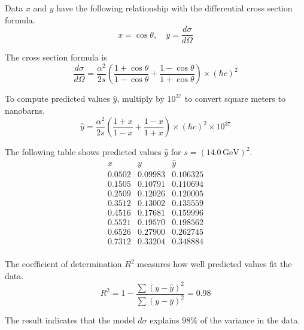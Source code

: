Data $x$ and $y$ have the following relationship
with the differential cross section formula.
\begin{equation*}
x=\cos\theta,
\quad
y=\frac{d\sigma}{d\Omega}
\end{equation*}

The cross section formula is
\begin{equation*}
\frac{d\sigma}{d\Omega}
=
\frac{\alpha^2}{2s}
\left(
\frac{1+\cos\theta}{1-\cos\theta}+
\frac{1-\cos\theta}{1+\cos\theta}
\right)\times(\hbar c)^2
\end{equation*}

To compute predicted values $\hat{y}$,
multiply by $10^{37}$ to convert square meters to nanobarns.
\begin{equation*}
\hat{y}
=
\frac{\alpha^2}{2s}
\left(
\frac{1+x}{1-x}+
\frac{1-x}{1+x}
\right)
\times(\hbar c)^2
\times10^{37}
\end{equation*}

The following table shows predicted values $\hat y$ for $s=(14.0\,\text{GeV})^2$.
\begin{equation*}
\begin{matrix}
x & y & \hat y\\
0.0502 & 0.09983 & 0.106325\\
0.1505 & 0.10791 & 0.110694\\
0.2509 & 0.12026 & 0.120005\\
0.3512 & 0.13002 & 0.135559\\
0.4516 & 0.17681 & 0.159996\\
0.5521 & 0.19570 & 0.198562\\
0.6526 & 0.27900 & 0.262745\\
0.7312 & 0.33204 & 0.348884\\
\end{matrix}
\end{equation*}

The coefficient of determination $R^2$ measures how well predicted values fit the data.
\begin{equation*}
R^2=1-\frac{\sum(y-\hat{y})^2}{\sum(y-\bar{y})^2}=0.98
\end{equation*}

The result indicates that the model $d\sigma$ explains 98\% of the variance in the data.


